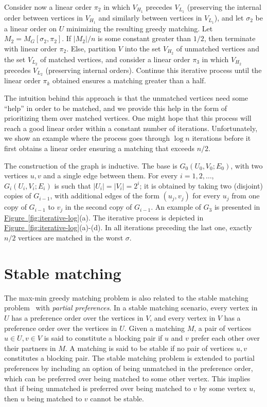 \documentclass[11pt]{article}
\numberwithin{equation}{section}
\theoremstyle{definition}
\theoremstyle{plain}
\newcommand{\expref}[2]{\hyperref[#2]{#1~\ref{#2}}}
\theoremstyle{plain}
\begin{document}
Consider now a linear order $\pi_2$ in which $V_{H_1}$ precedes $V_{L_1}$ (preserving the internal order between vertices in $V_{H_1}$ and similarly between vertices in $V_{L_1}$), and let $\sigma_2$ be a linear order on $U$ minimizing the resulting greedy matching.
Let $M_2=M_G[\sigma_2,\pi_2]$.
If $|M_2|/n$ is some constant greater than $1/2$, then terminate with linear order $\pi_2$.
Else, partition $V$ into the set $V_{H_2}$ of unmatched vertices and the set $V_{L_2}$ of matched vertices, and consider a linear order $\pi_3$ in which $V_{H_2}$ precedes $V_{L_2}$ (preserving internal orders).
Continue this iterative process until the
%
linear order $\pi_k$ obtained  %
ensures a matching greater than a half.

The intuition behind this approach is that the unmatched vertices need some ``help'' in order to be matched, and we provide this help in the form of
prioritizing them over matched vertices. %
%
%
One might hope that this process will reach a good linear order within a constant number of iterations.
Unfortunately, we show an example where the process goes through $\log n$ iterations before it first obtains a linear order ensuring a matching that exceeds $n/2$.

The construction of the graph is inductive.
The base is $G_0(U_0,V_0;E_0)$, with two vertices $u,v$ and a single edge between them.
For every $i=1,2,\ldots$, $G_i(U_i,V_i;E_i)$ is such that $|U_i|=|V_i|=2^i$; it is obtained by taking two (disjoint) copies of $G_{i-1}$, with additional edges of the form $(u_j,v_j)$ for every $u_j$ from one copy of $G_{i-1}$ to $v_j$ in the second copy of $G_{i-1}$.
An example of $G_3$ is presented in \expref{Figure}{fig:iterative-log}(a).
The iterative process is depicted in \expref{Figure}{fig:iterative-log}(a)-(d).
In all iterations preceding the last one, exactly $n/2$ vertices are matched in the worst $\sigma$.

\section{Stable matching}
\label{sec:stable-matching}
The max-min greedy matching problem is also related to the stable matching problem~\cite{GS62} with \emph{partial preferences}.
In a stable matching scenario, every vertex in $U$ has a preference order over %
the vertices in $V$, and every vertex in $V$ has a preference order over %
the vertices in $U$. Given a matching $M$, a pair of vertices $u \in U, v \in V$ is said to constitute a blocking pair if $u$ and $v$ %
prefer each other over their partners in $M$. A matching is said to be stable if no pair of vertices $u,v$ constitutes a blocking pair. The stable matching problem is extended to partial preferences by including an option of being unmatched in the preference order, which can be preferred over being matched to some other vertex. This implies that if %
being  %
unmatched is preferred over being matched to $v$ by some vertex $u$, then $u$ being matched to $v$ cannot be stable.  
%
%
%
%
\end{document}
